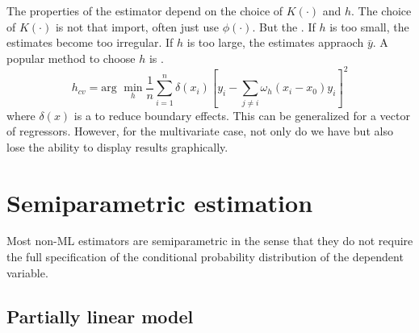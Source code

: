 The properties of the estimator depend on the choice of $K(\cdot)$ and $h$. 
The choice of $K(\cdot)$ is not that import, often just use $\phi(\cdot)$.
But the .
If $h$ is too small, the estimates become too irregular. If $h$ is too large, the estimates appraoch $\bar{y}$.
A popular method to choose $h$ is .
\begin{equation*}
    h_{cv} = \text{arg }\min_{h}\frac{1}{n}\sum_{i=1}^{n}\delta(x_i)\left[y_i - \sum_{j\neq i}\omega_h(x_i-x_0)y_i\right]^2
\end{equation*}
where $\delta(x)$ is a  to reduce boundary effects.
This can be generalized for a vector of regressors. 
However, for the multivariate case, not only do we have  but also lose the ability to display results graphically.

\section{Semiparametric estimation}

Most non-ML estimators are semiparametric in the sense that they do not require the full specification of the conditional probability distribution of the dependent variable.

\subsection{Partially linear model}


